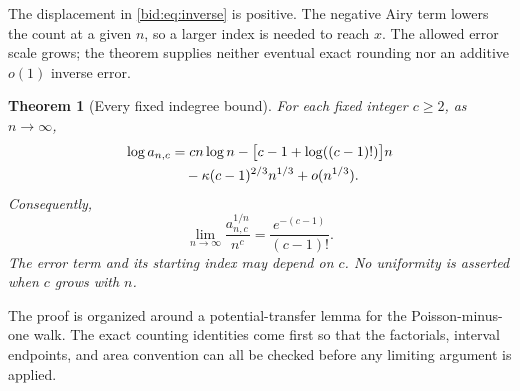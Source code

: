 \documentclass[11pt,letterpaper]{article}
\numberwithin{equation}{section}
\newtheorem{theorem}{Theorem}[section]
\theoremstyle{remark}\newtheorem{remark}[theorem]{Remark}
\begin{document}
The displacement in \eqref{bid:eq:inverse} is positive. The negative Airy
term lowers the count at a given $n$, so a larger index is needed to
reach $x$. The allowed error scale grows; the theorem supplies
neither eventual exact rounding nor an additive $o(1)$ inverse error.

\begin{theorem}[Every fixed indegree bound]\label{bid:thm:fixedc}
For each fixed integer $c\geq2$, as $n\to\infty$,
\begin{align}
 \log a_{n,c}
 &=cn\log n-\bigl[c-1+\log((c-1)!)\bigr]n\notag\\
 &\hspace{1em}-\kappa(c-1)^{2/3}n^{1/3}+o(n^{1/3}).
 \label{bid:eq:fixedc}
\end{align}
Consequently,
\begin{equation}\label{bid:eq:fixedroot}
 \lim_{n\to\infty}\frac{a_{n,c}^{1/n}}{n^c}
 =\frac{e^{-(c-1)}}{(c-1)!}.
\end{equation}
The error term and its starting index may depend on $c$. No uniformity
is asserted when $c$ grows with $n$.
\end{theorem}

The proof is organized around a potential-transfer lemma for the
Poisson-minus-one walk. The exact counting identities come first so
that the factorials, interval endpoints, and area convention can all be
checked before any limiting argument is applied.
\end{document}
